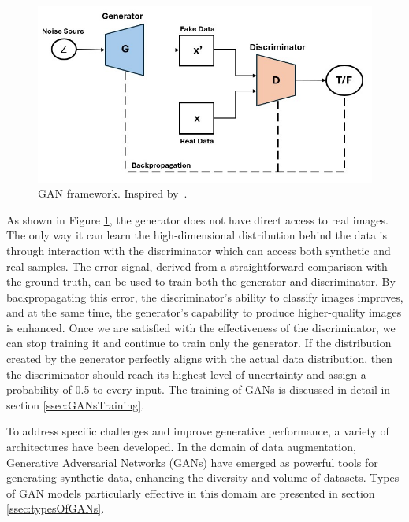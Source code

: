 \begin{figure}[!htb]
    \centering
    \includegraphics[scale=0.5]{Images/gan_framework.jpg}
    \caption{GAN framework. Inspired by~\cite{GANFramework}.}
    \label{fig:GANFramework}
\end{figure}

As shown in Figure \ref{fig:GANFramework}, the generator does not have direct access to real images. The only way it can learn the high-dimensional distribution behind the data is through interaction with the discriminator which can access both synthetic and real samples. The error signal, derived from a straightforward comparison with the ground truth, can be used to train both the generator and discriminator. By backpropagating this error, the discriminator's ability to classify images improves, and at the same time, the generator's capability to produce higher-quality images is enhanced. Once we are satisfied with the effectiveness of the discriminator, we can stop training it and continue to train only the generator. 
If the distribution created by the generator perfectly aligns with the actual data distribution, then the discriminator should reach its highest level of uncertainty and assign a probability of 0.5 to every input.\cite{GANOverview} The training of GANs is discussed in detail in section \ref{ssec:GANsTraining}.

To address specific challenges and improve generative performance, a variety of architectures have been developed. In the domain of data augmentation, Generative Adversarial Networks (GANs) have emerged as powerful tools for generating synthetic data, enhancing the diversity and volume of datasets. Types of GAN models particularly effective in this domain are presented in section \ref{ssec:typesOfGANs}.


